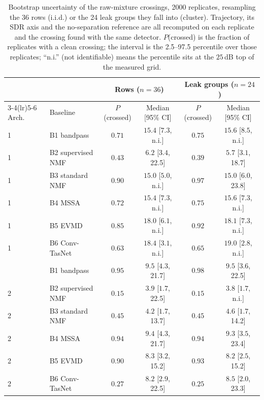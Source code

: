 \documentclass[11pt]{article}
\begin{document}
\begin{table}[H]
\centering
\caption{Bootstrap uncertainty of the raw-mixture crossings, 2000 replicates, resampling the 36 rows (i.i.d.) or the 24 leak groups they fall into (cluster). Trajectory, its SDR axis and the no-separation reference are all recomputed on each replicate and the crossing found with the same detector. $P$(crossed) is the fraction of replicates with a clean crossing; the interval is the 2.5--97.5 percentile over those replicates; ``n.i.'' (not identifiable) means the percentile sits at the $25$\,dB top of the measured grid.}
\label{tab:kneeboot}
\small
\begin{tabular}{@{}llcccc@{}}
\toprule
 & & \multicolumn{2}{c}{Rows ($n{=}36$)} & \multicolumn{2}{c}{Leak groups ($n{=}24$)} \\
\cmidrule(lr){3-4}\cmidrule(lr){5-6}
Arch.\ & Baseline & $P$(crossed) & Median [95\% CI] & $P$(crossed) & Median [95\% CI] \\
\midrule
1 & B1 bandpass        & $0.71$ & $15.4$ [$7.3$, n.i.] & $0.75$ & $15.6$ [$8.5$, n.i.] \\
1 & B2 supervised NMF  & $0.43$ & $6.2$ [$3.4$, 22.5] & $0.39$ & $5.7$ [$3.1$, 18.7] \\
1 & B3 standard NMF    & $0.90$ & $15.0$ [$5.0$, n.i.] & $0.97$ & $15.0$ [$6.0$, 23.8] \\
1 & B4 MSSA            & $0.72$ & $15.4$ [$7.3$, n.i.] & $0.75$ & $15.6$ [$7.3$, n.i.] \\
1 & B5 EVMD            & $0.85$ & $18.0$ [$6.1$, n.i.] & $0.92$ & $18.1$ [$7.3$, n.i.] \\
1 & B6 Conv-TasNet     & $0.63$ & $18.4$ [$3.1$, n.i.] & $0.65$ & $19.0$ [$2.8$, n.i.] \\
\addlinespace
2 & B1 bandpass        & $0.95$ & $9.5$ [$4.3$, 21.7] & $0.98$ & $9.5$ [$3.6$, 22.5] \\
2 & B2 supervised NMF  & $0.15$ & $3.9$ [$1.7$, 22.5] & $0.15$ & $3.8$ [$1.7$, n.i.] \\
2 & B3 standard NMF    & $0.45$ & $4.2$ [$1.7$, 13.7] & $0.45$ & $4.6$ [$1.7$, 14.2] \\
2 & B4 MSSA            & $0.94$ & $9.4$ [$4.3$, 21.7] & $0.94$ & $9.3$ [$3.5$, 23.4] \\
2 & B5 EVMD            & $0.90$ & $8.3$ [$3.2$, 15.2] & $0.93$ & $8.2$ [$2.5$, 15.2] \\
2 & B6 Conv-TasNet     & $0.27$ & $8.2$ [$2.9$, 22.5] & $0.25$ & $8.5$ [$2.0$, 23.3] \\
\bottomrule
\end{tabular}
\end{table}
\end{document}
